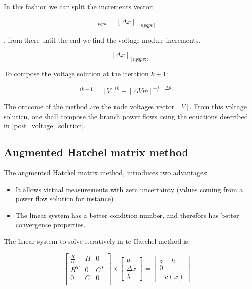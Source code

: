 \documentclass[nols,a4paper,twoside,notoc,fleqn]{tufte-book}
\begin{document}
In this fashion we can split the increments vector:

\begin{equation}
[\Delta \theta] _{pqpv} = [\Delta x]_{[:npqpv]}
\end{equation}

, from there until the end we find the voltage module increments.

\begin{equation}
 [\Delta Vm] = [\Delta x]_{[npqpv::]}
\end{equation}

To compose the voltage solution at the iteration $k+1$:

\begin{equation}
[V]^{(k+1} =  [V]^{(k} + [\Delta Vm] ^{-j \cdot [\Delta \theta]}
\end{equation}

The outcome of the method are the node voltages vector $[V]$. From this voltage solution, one shall compose the branch power flows using the equations described in \ref{post_voltage_solution}.

\subsection{Augmented Hatchel matrix method}

The augmented Hatchel matrix method, introduces two advantages: 
\begin{itemize}
	\item It allows virtual measurements with zero uncertainty (values coming from a power flow solution for instance)
	\item The linear system has a better condition number, and therefore has better convergence properties.
\end{itemize}

The linear system to solve iteratively in te Hatchel method is:

\begin{equation}
\begin{bmatrix}
\frac{R}{\alpha} & H & 0 \\
H^T & 0 & C^T \\
0 & C & 0 \\
\end{bmatrix}
\times
\begin{bmatrix}
\mu\\
\Delta x\\
\lambda
\end{bmatrix}
=
\begin{bmatrix}
z-h\\
0\\
-c(x)
\end{bmatrix}
\end{equation}
\end{document}
